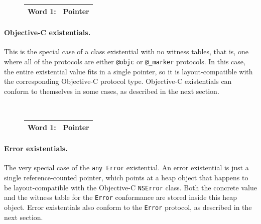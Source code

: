 \documentclass[../generics]{subfiles}
\begin{document}
\begin{figure}
\begin{minipage}{13em}
\begin{center}
\begin{tabular}{|l|c|}
\hline
Word 1:&Pointer\\
\hline
\end{tabular}
\end{center}
\end{minipage}
\end{figure}

\paragraph{Objective-C existentials.} This is the special case of a class existential with no witness tables, that is, one where all of the protocols are either \texttt{@objc} or \verb|@_marker| protocols. In this case, the entire existential value fits in a single pointer, so it is layout-compatible with the corresponding Objective-C protocol type. Objective-C existentials can conform to themselves in some cases, as described in the next section.

\begin{figure}
\begin{minipage}{13em}
\begin{center}
\ \\
\begin{tabular}{|l|c|}
\hline
Word 1:&Pointer\\
\hline
\end{tabular}
\end{center}
\end{minipage}
\end{figure}

\paragraph{Error existentials.} The very special case of the \texttt{any~Error} existential. An error existential is just a single reference-counted pointer, which points at a heap object that happens to be layout-compatible with the Objective-C \texttt{NSError} class. Both the concrete value and the witness table for the \texttt{Error} conformance are stored inside this heap object. Error existentials also conform to the \texttt{Error} protocol, as described in the next section.
\end{document}
